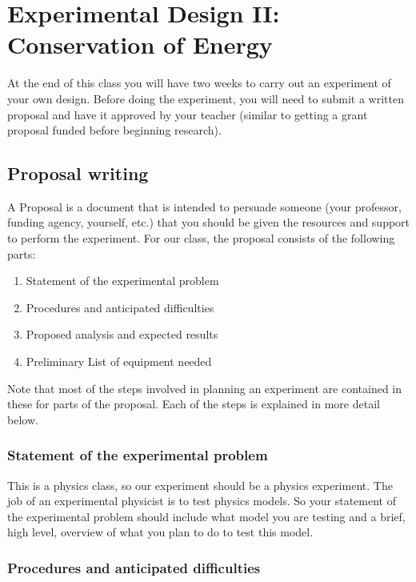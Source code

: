 \documentclass[twoside,11pt,ShortChapTitles]{BYUTextbook}
\begin{document}
\chapter{Experimental Design II: Conservation of Energy}
At the end of this class you will have two weeks to carry out an experiment of your own design. Before doing the experiment, you will need to submit a written proposal and have it approved by your teacher (similar to getting a grant proposal funded before beginning research).

\section{Proposal writing}

A Proposal is a document that is intended to persuade someone (your
professor, funding agency, yourself, etc.) that you should be given the
resources and support to perform the experiment. For our class, the proposal
consists of the following parts:

\begin{enumerate}
\item Statement of the experimental problem

\item Procedures and anticipated difficulties

\item Proposed analysis and expected results

\item Preliminary List of equipment needed
\end{enumerate}

Note that most of the steps involved in planning an experiment are contained
in these for parts of the proposal. Each of the steps is explained in more
detail below.

\subsection{Statement of the experimental problem}

This is a physics class, so our experiment should be a physics experiment.
The job of an experimental physicist is to test physics models. So your
statement of the experimental problem should include what model you are
testing and a brief, high level, overview of what you plan to do to test
this model.

\subsection{Procedures and anticipated difficulties}
\end{document}
